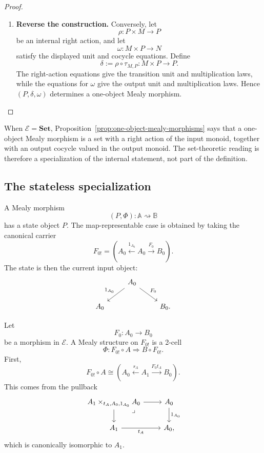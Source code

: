 \begin{proof}
\begin{enumerate}
        \item \textbf{Reverse the construction.} Conversely, let
        \[
            \rho:P\times M\to P
        \]
        be an internal right action, and let
        \[
            \omega:M\times P\to N
        \]
        satisfy the displayed unit and cocycle equations. Define
        \[
            \delta
            :=
            \rho\circ\tau_{M,P}
            :
            M\times P\to P.
        \]
        The right-action equations give the transition unit and multiplication laws, while the equations for \(\omega\) give the output unit and multiplication laws. Hence \((P,\delta,\omega)\) determines a one-object Mealy morphism.
    \end{enumerate}
\end{proof}

\begin{remark}
\label{rem:set-one-object-systems}
    When \(\mathcal E=\mathbf{Set}\), Proposition~\ref{prop:one-object-mealy-morphisms} says that a one-object Mealy morphism is a set with a right action of the input monoid, together with an output cocycle valued in the output monoid. The set-theoretic reading is therefore a specialization of the internal statement, not part of the definition.
\end{remark}

\subsection{The stateless specialization}
\label{subsec:stateless-mealy-morphisms}

A Mealy morphism
\[
    (P,\Phi):\mathbb A\rightsquigarrow\mathbb B
\]
has a state object \(P\). The map-representable case is obtained by taking the canonical carrier
\[
    F_{0!}
    =
    \left(
        A_0
        \xleftarrow{1_{A_0}}
        A_0
        \xrightarrow{F_0}
        B_0
    \right).
\]
The state is then the current input object:
\[
    \begin{tikzcd}
        & 
            A_0 
                \arrow[dl, "1_{A_0}"'] 
                \arrow[dr, "F_0"] 
        & 
        \\
            A_0 
        &
        & 
            B_0.
    \end{tikzcd}
\]

Let
\[
    F_0:A_0\to B_0
\]
be a morphism in \(\mathcal E\). A Mealy structure on \(F_{0!}\) is a 2-cell
\[
    \Phi:F_{0!}\circ A\Rightarrow B\circ F_{0!}.
\]
First,
\[
    F_{0!}\circ A
    \cong
    \left(
        A_0
        \xleftarrow{s_A}
        A_1
        \xrightarrow{F_0t_A}
        B_0
    \right).
\]
This comes from the pullback
\[
    \begin{tikzcd}
            A_1\times_{t_A,A_0,1_{A_0}}A_0
                \arrow[r]
                \arrow[d]
                \arrow[dr, phantom, "\lrcorner", very near start]
        &
            A_0 
                \arrow[d, "1_{A_0}"]
        \\
            A_1 
                \arrow[r, "t_A"']
        &
            A_0,
    \end{tikzcd}
\]
which is canonically isomorphic to \(A_1\).

